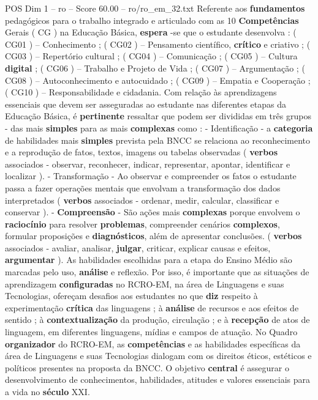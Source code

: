 \begin{textsample}{POS Dim 1 – ro – Score 60.00 – ro/ro\_em\_32.txt}
Referente aos \textbf{fundamentos} pedagógicos para o trabalho integrado e articulado com as 10 \textbf{Competências} Gerais ( CG ) na Educação Básica, \textbf{espera} -se que o estudante desenvolva : ( CG01 ) – Conhecimento ; ( CG02 ) – Pensamento científico, \textbf{crítico} e criativo ; ( CG03 ) – Repertório cultural ; ( CG04 ) – Comunicação ; ( CG05 ) – Cultura \textbf{digital} ; ( CG06 ) – Trabalho e Projeto de Vida ; ( CG07 ) – Argumentação ; ( CG08 ) – Autoconhecimento e autocuidado ; ( CG09 ) – Empatia e Cooperação ; ( CG10 ) – Responsabilidade e cidadania.
Com relação às aprendizagens essenciais que devem ser asseguradas ao estudante nas diferentes etapas da Educação Básica, é \textbf{pertinente} ressaltar que podem ser divididas em três grupos - das mais \textbf{simples} para as mais \textbf{complexas} como : - Identificação - a \textbf{categoria} de habilidades mais \textbf{simples} prevista pela BNCC se relaciona ao reconhecimento e a reprodução de fatos, textos, imagens ou tabelas observadas ( \textbf{verbos} associados - observar, reconhecer, indicar, representar, apontar, identificar e localizar ). - Transformação - Ao observar e compreender os fatos o estudante passa a fazer operações mentais que envolvam a transformação dos dados interpretados ( \textbf{verbos} associados - ordenar, medir, calcular, classificar e conservar ). - \textbf{Compreensão} - São ações mais \textbf{complexas} porque envolvem o \textbf{raciocínio} para resolver \textbf{problemas}, compreender cenários \textbf{complexos}, formular proposições e \textbf{diagnósticos}, além de apresentar conclusões. ( \textbf{verbos} associados - avaliar, analisar, \textbf{julgar}, criticar, explicar causas e efeitos, \textbf{argumentar} ).
As habilidades escolhidas para a etapa do Ensino Médio são marcadas pelo uso, \textbf{análise} e reflexão.
Por isso, é importante que as situações de aprendizagem \textbf{configuradas} no RCRO-EM, na área de Linguagens e suas Tecnologias, ofereçam desafios aos estudantes no que \textbf{diz} respeito à experimentação \textbf{crítica} das linguagens ; à \textbf{análise} de recursos e aos efeitos de sentido ; à \textbf{contextualização} da produção, circulação ; e à \textbf{recepção} de atos de linguagem, em diferentes linguagens, mídias e campos de atuação.
No Quadro \textbf{organizador} do RCRO-EM, as \textbf{competências} e as habilidades específicas da área de Linguagens e suas Tecnologias dialogam com os direitos éticos, estéticos e políticos presentes na proposta da BNCC.
O objetivo \textbf{central} é assegurar o desenvolvimento de conhecimentos, habilidades, atitudes e valores essenciais para a vida no \textbf{século} XXI.

\end{textsample}
